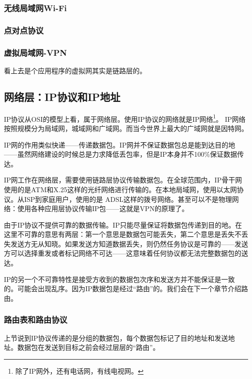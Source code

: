 \subsubsection{无线局域网Wi-Fi}

\subsubsection{点对点协议}

\subsubsection{虚拟局域网-VPN}

看上去是个应用程序的虚拟网其实是链路层的。

\subsection{网络层：IP协议和IP地址}

IP协议从OSI的模型上看，属于网络层。使用IP协议的网络就是IP网络\footnote{除了IP网外，还有电话网，有线电视网。}。
IP网络按照规模分为局域网，城域网和广域网。而当今世界上最大的广域网就是因特网。

IP网的作用类似快递——传递数据包。IP网并不保证数据包总是能到达目的地——虽然网络建设的时候总是力求降低丢包率，但是IP本身并不100\%保证数据传达。

IP网工作在网络层，需要使用链路层协议传输数据包。在全球范围内，IP骨干网使用的是ATM和X.25这样的光纤网络进行传输的。在本地局域网，使用以太网协议。从ISP到家庭用户，使用的是
ADSL这样的拨号网络。甚至可以不是物理网络：使用各种应用层协议传输IP包——这就是VPN的原理了。

由于IP协议不提供可靠的数据传输。IP只能尽量保证将数据包传递到目的地。在这里不可靠的意思有两层：第一个意思是数据包可能丢失，第二个意思是丢失不丢失发送方无从知晓。如果发送方知道数据丢失，则仍然任务协议是可靠的——发送方可以选择重发或者标记网络不可达——这意味着任何协议都无法完整数据包的送达。

IP的另一个不可靠特性是接受方收到的数据包次序和发送方并不能保证是一致的。可能会出现乱序。因为IP数据包是经过“路由”的。我们会在下一个章节介绍路由。

\subsubsection{路由表和路由协议}

上节说到IP协议传递的是分组的数据包，每个数据包标记了目的地址和发送地址。数据包在发送到目标之前会经过层层的“路由”。

